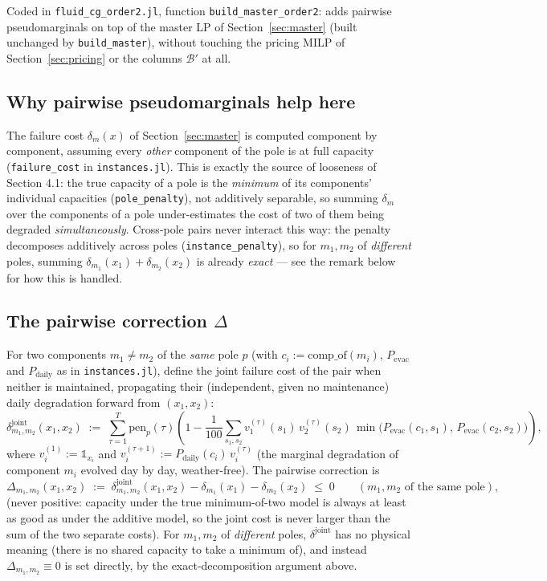 \documentclass[11pt]{article}
\begin{document}
Coded in \texttt{fluid\_cg\_order2.jl}, function \texttt{build\_master\_order2}: adds
pairwise pseudomarginals on top of the master LP of Section~\ref{sec:master} (built
unchanged by \texttt{build\_master}), without touching the pricing MILP of
Section~\ref{sec:pricing} or the columns $\mathcal B'$ at all.

\subsection*{Why pairwise pseudomarginals help here}
The failure cost $\delta_m(x)$ of Section~\ref{sec:master} is computed component by
component, assuming every \emph{other} component of the pole is at full capacity
(\texttt{failure\_cost} in \texttt{instances.jl}). This is exactly the source of
looseness of Section 4.1: the true capacity of a pole is the \emph{minimum} of its
components' individual capacities (\texttt{pole\_penalty}), not additively separable, so
summing $\delta_m$ over the components of a pole under-estimates the cost of two of them
being degraded \emph{simultaneously}. Cross-pole pairs never interact this way: the
penalty decomposes additively across poles (\texttt{instance\_penalty}), so for
$m_1, m_2$ of \emph{different} poles, summing $\delta_{m_1}(x_1) + \delta_{m_2}(x_2)$ is
already \emph{exact} --- see the remark below for how this is handled.

\subsection*{The pairwise correction $\Delta$}
For two components $m_1 \ne m_2$ of the \emph{same} pole $p$ (with
$c_i := \mathrm{comp\_of}(m_i)$, $P_{\mathrm{evac}}$ and $P_{\mathrm{daily}}$ as in
\texttt{instances.jl}), define the joint failure cost of the pair when neither is
maintained, propagating their (independent, given no maintenance) daily degradation
forward from $(x_1,x_2)$:
\[
  \delta^{\mathrm{joint}}_{m_1,m_2}(x_1,x_2) \;:=\; \sum_{\tau=1}^{T}
  \mathrm{pen}_p(\tau) \left(1 - \frac{1}{100} \sum_{s_1,s_2}
  v_1^{(\tau)}(s_1)\, v_2^{(\tau)}(s_2)\, \min\bigl(P_{\mathrm{evac}}(c_1,s_1),\,
  P_{\mathrm{evac}}(c_2,s_2)\bigr) \right),
\]
where $v_i^{(1)} := \mathbb 1_{x_i}$ and $v_i^{(\tau+1)} := P_{\mathrm{daily}}(c_i)\,
v_i^{(\tau)}$ (the marginal degradation of component $m_i$ evolved day by day, weather-free).
The pairwise correction is
\[
  \Delta_{m_1,m_2}(x_1,x_2) \;:=\; \delta^{\mathrm{joint}}_{m_1,m_2}(x_1,x_2)
  - \delta_{m_1}(x_1) - \delta_{m_2}(x_2) \;\le\; 0 \qquad (m_1, m_2 \text{ of the same pole}),
\]
(never positive: capacity under the true minimum-of-two model is always at least as good
as under the additive model, so the joint cost is never larger than the sum of the two
separate costs). For $m_1, m_2$ of \emph{different} poles, $\delta^{\mathrm{joint}}$ has no
physical meaning (there is no shared capacity to take a minimum of), and instead
$\Delta_{m_1,m_2} \equiv 0$ is set directly, by the exact-decomposition argument above.
\end{document}
